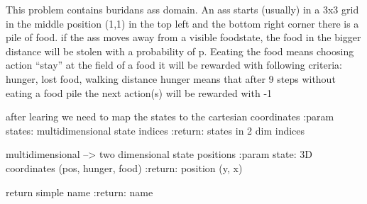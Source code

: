 \documentclass[letterpaper,10pt,english]{sphinxmanual}
\begin{document}
\begin{fulllineitems}
\label{Problems:morl_problems.MORLBuridansAssProblem}
This problem contains buridans ass domain. An ass starts (usually) in a 3x3 grid in the middle position (1,1)
in the top left and the bottom right corner there is a pile of food. if the ass moves away from a visible foodstate,
the food in the bigger distance will be stolen with a probability of p. Eeating the food means choosing action
``stay'' at the field of a food
it will be rewarded with following criteria: hunger, lost food, walking distance
hunger means that after 9 steps without eating a food pile the next action(s) will be rewarded with -1

\begin{fulllineitems}
\label{Problems:morl_problems.MORLBuridansAssProblem.create_plottable_states}
after learing we need to map the states to the cartesian coordinates
:param states: multidimensional state indices
:return: states in 2 dim indices

\end{fulllineitems}


\begin{fulllineitems}
\label{Problems:morl_problems.MORLBuridansAssProblem.get_cartesian_coordinates_from_pos_state}
multidimensional --\textgreater{} two dimensional state positions
:param state: 3D coordinates (pos, hunger, food)
:return: position (y, x)

\end{fulllineitems}


\begin{fulllineitems}
\label{Problems:morl_problems.MORLBuridansAssProblem.name}
return simple name
:return: name

\end{fulllineitems}


\end{fulllineitems}
\end{document}
